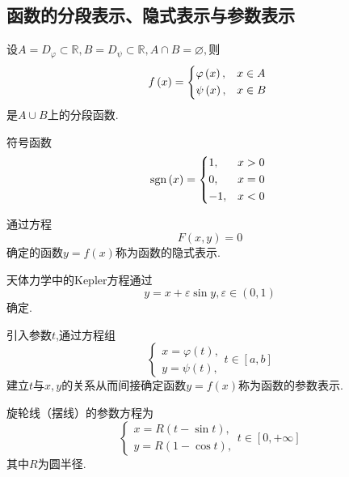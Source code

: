\subsection{函数的分段表示、隐式表示与参数表示}
\begin{formal}
    \begin{definition}[函数的分段表示的定义]\label{def:函数的分段表示的定义}
        设$A=D_{\varphi}\subset\mathbb{R},B=D_{\psi}\subset\mathbb{R},A\cap B=\varnothing,$则\[
        f\left(x\right)=\begin{cases*}
            \varphi\left(x\right),&$x\in A$\\
            \psi\left(x\right),&$x\in B$
        \end{cases*}
        \]是$A\cup B$上的分段函数.
    \end{definition}
\end{formal}
\begin{brown}
    \begin{example}
        符号函数\[
        \text{sgn}\left(x\right)=\begin{cases*}
            1,&$x>0$\\
            0,&$x=0$\\
            -1,&$x<0$
        \end{cases*}
        \]
    \end{example}
\end{brown}
\begin{formal}
    \begin{definition}[函数的隐式表示的定义]\label{def:函数的隐式表示的定义}
        通过方程\[
        F\left(x,y\right)=0
        \]确定的函数$y=f\left(x\right)$称为函数的隐式表示.
    \end{definition}
\end{formal}
\begin{brown}
    \begin{example}
        天体力学中的\textup{Kepler}方程通过\[
        y=x+\varepsilon\sin y,\varepsilon\in\left(0,1\right)
        \]确定.
    \end{example}
\end{brown}
\begin{formal}
    \begin{definition}[函数的参数表示的定义]\label{def:函数的参数表示的定义}
        引入参数$t$,通过方程组\[
        \begin{cases*}
            x=\varphi\left(t\right),\\
            y=\psi\left(t\right),
        \end{cases*}t\in\left[a,b\right]
        \]建立$t$与$x,y$的关系从而间接确定函数$y=f\left(x\right)$称为函数的参数表示.
    \end{definition}
\end{formal}
\begin{brown}
    \begin{example}
        旋轮线（摆线）的参数方程为\[
        \begin{cases*}
            x=R\left(t-\sin t\right),\\
            y=R\left(1-\cos t\right),
        \end{cases*}t\in\left[0,+\infty\right]
        \]其中$R$为圆半径.
    \end{example}
\end{brown}
